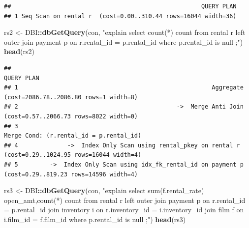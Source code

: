\documentclass[]{book}
\newenvironment{Shaded}{\begin{snugshade}}{\end{snugshade}}
\newcommand{\KeywordTok}[1]{\textcolor[rgb]{0.13,0.29,0.53}{\textbf{#1}}}
\newcommand{\NormalTok}[1]{#1}
\newcommand{\OperatorTok}[1]{\textcolor[rgb]{0.81,0.36,0.00}{\textbf{#1}}}
\newcommand{\StringTok}[1]{\textcolor[rgb]{0.31,0.60,0.02}{#1}}
\theoremstyle{definition}
\theoremstyle{definition}
\theoremstyle{definition}
\theoremstyle{remark}
\begin{document}
\begin{verbatim}
##                                                      QUERY PLAN
## 1 Seq Scan on rental r  (cost=0.00..310.44 rows=16044 width=36)
\end{verbatim}

\begin{Shaded}
\begin{Highlighting}[]
\NormalTok{rs2 <-}\StringTok{ }\NormalTok{DBI}\OperatorTok{::}\KeywordTok{dbGetQuery}\NormalTok{(con,}
                \StringTok{"explain select count(*) count}
\StringTok{                   from rental r }
\StringTok{                        left outer join payment p }
\StringTok{                          on r.rental_id = p.rental_id  }
\StringTok{                    where p.rental_id is null}
\StringTok{                 ;"}\NormalTok{)}
\KeywordTok{head}\NormalTok{(rs2)}
\end{Highlighting}
\end{Shaded}

\begin{verbatim}
##                                                                                                QUERY PLAN
## 1                                                       Aggregate  (cost=2086.78..2086.80 rows=1 width=8)
## 2                                             ->  Merge Anti Join  (cost=0.57..2066.73 rows=8022 width=0)
## 3                                                                 Merge Cond: (r.rental_id = p.rental_id)
## 4              ->  Index Only Scan using rental_pkey on rental r  (cost=0.29..1024.95 rows=16044 width=4)
## 5         ->  Index Only Scan using idx_fk_rental_id on payment p  (cost=0.29..819.23 rows=14596 width=4)
\end{verbatim}

\begin{Shaded}
\begin{Highlighting}[]
\NormalTok{rs3 <-}\StringTok{ }\NormalTok{DBI}\OperatorTok{::}\KeywordTok{dbGetQuery}\NormalTok{(con,}
                \StringTok{"explain select sum(f.rental_rate) open_amt,count(*) count}
\StringTok{                   from rental r }
\StringTok{                        left outer join payment p }
\StringTok{                          on r.rental_id = p.rental_id }
\StringTok{                        join inventory i}
\StringTok{                          on r.inventory_id = i.inventory_id}
\StringTok{                        join film f}
\StringTok{                          on i.film_id = f.film_id}
\StringTok{                    where p.rental_id is null}
\StringTok{                 ;"}\NormalTok{)}
\KeywordTok{head}\NormalTok{(rs3)}
\end{Highlighting}
\end{Shaded}
\end{document}
